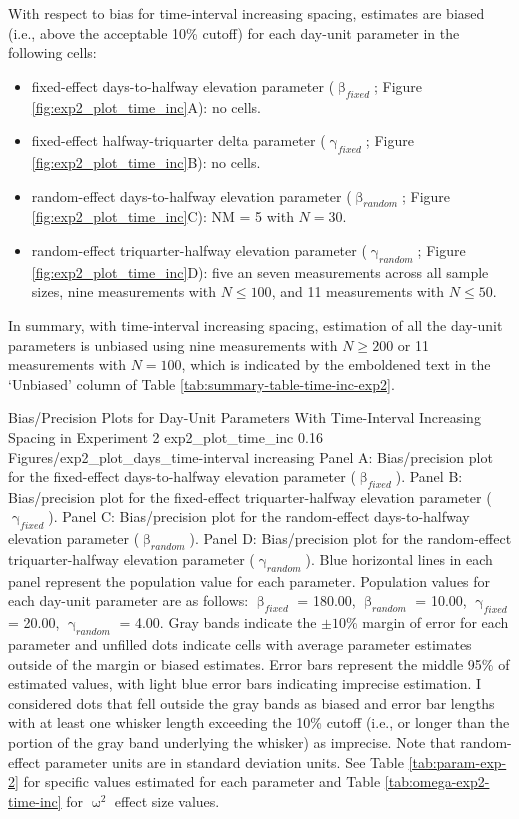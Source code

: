 \documentclass[
12pt, %
twoside,
english]{guelphthesis}
\begin{document}
With respect to bias for time-interval increasing spacing, estimates are biased (i.e., above the acceptable 10\% cutoff) for each day-unit parameter in the following cells:
\begin{itemize}
\tightlist
\item
  fixed-effect days-to-halfway elevation parameter (\(\upbeta_{fixed}\); Figure \ref{fig:exp2_plot_time_inc}A): no cells.
\item
  fixed-effect halfway-triquarter delta parameter (\(\upgamma_{fixed}\); Figure \ref{fig:exp2_plot_time_inc}B): no cells.
\item
  random-effect days-to-halfway elevation parameter (\(\upbeta_{random}\); Figure \ref{fig:exp2_plot_time_inc}C): NM = 5 with \(N = 30\).\\
\item
  random-effect triquarter-halfway elevation parameter (\(\upgamma_{random}\); Figure \ref{fig:exp2_plot_time_inc}D): five an seven measurements across all sample sizes, nine measurements with \(N \le 100\), and 11 measurements with \(N \le 50\).
\end{itemize}
In summary, with time-interval increasing spacing, estimation of all the day-unit parameters is unbiased using nine measurements with \(N \ge 200\) or 11 measurements with \(N = 100\), which is indicated by the emboldened text in the `Unbiased' column of Table \ref{tab:summary-table-time-inc-exp2}.
\begin{apaFigure}
[portrait]
[samepage]
[-0.2cm]
{Bias/Precision Plots for Day-Unit Parameters With Time-Interval Increasing Spacing in Experiment 2}
{exp2_plot_time_inc}
{0.16}
{Figures/exp2_plot_days_time-interval increasing}
{Panel A: Bias/precision plot for the fixed-effect days-to-halfway elevation parameter ($\upbeta_{fixed}$). Panel B: Bias/precision plot for the fixed-effect triquarter-halfway elevation parameter ($\upgamma_{fixed}$). Panel C: Bias/precision plot for the random-effect days-to-halfway elevation parameter ($\upbeta_{random}$). Panel D: Bias/precision plot for the random-effect triquarter-halfway elevation parameter ($\upgamma_{random}$). Blue horizontal lines in each panel represent the population value for each parameter. Population values for each day-unit parameter are as follows: $\upbeta_{fixed}$ = 180.00, $\upbeta_{random}$ = 10.00, $\upgamma_{fixed}$ = 20.00, $\upgamma_{random}$ = 4.00. Gray bands indicate the $\pm 10\%$ margin of error for each parameter and unfilled dots indicate cells with average parameter estimates outside of the margin or biased estimates. Error bars represent the middle 95\% of estimated values, with light blue error bars indicating imprecise estimation. I considered dots that fell outside the gray bands as biased and error bar lengths with at least one whisker length exceeding the 10\% cutoff (i.e., or longer than the portion of the gray band underlying the whisker) as imprecise. Note that random-effect parameter units are in standard deviation units. See Table \ref{tab:param-exp-2} for specific values estimated for each parameter and Table \ref{tab:omega-exp2-time-inc} for $\upomega^2$ effect size values.}
\end{apaFigure}
\end{document}
